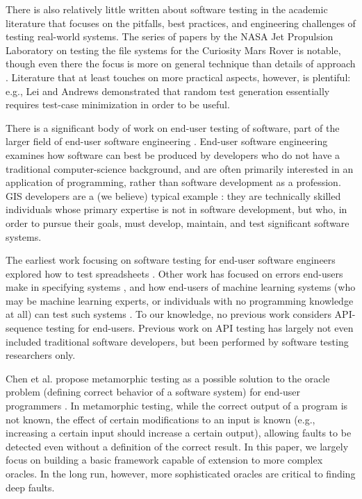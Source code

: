 There is also relatively little written about software testing in the
academic literature that focuses on the pitfalls, best practices, and
engineering challenges of testing real-world systems.  The series of
papers by the NASA Jet Propulsion Laboratory on testing the file
systems for the Curiosity Mars Rover is notable, though even there the
focus is more on general technique than details of approach
\cite{ICSEDiff,CFV08,AMAI}.  Literature that at least touches on more
practical aspects, however, is plentiful: e.g., Lei and Andrews
\cite{MinUnit} demonstrated that random test generation essentially
requires test-case minimization \cite{DD} in order to be useful.

There is a significant body of work on end-user testing of software,
part of the larger field of end-user software engineering
\cite{burnettEUSE,Silos}.  End-user software engineering examines how
software can best be produced by developers who do not have a
traditional computer-science background, and are often primarily
interested in an application of programming, rather than software
development as a profession.  GIS developers are a (we believe)
typical example \cite{Segal07}:  they are technically skilled  individuals whose
primary expertise is not in software development, but who, in order to
pursue their goals, must develop, maintain, and test significant
software systems.

The earliest work focusing on software testing for
end-user software engineers explored how to test spreadsheets
\cite{rothermelTOSEM,rothermel2000wysiwyt}.  Other work has focused on
errors end-users make in specifying systems \cite{Phalgune}, and how
end-users of machine learning systems (who may be machine learning
experts, or individuals with no programming knowledge at all) can test
such systems \cite{OnlyOracle,kulesza-eud11,shinsel-vlhcc}.  To our
knowledge, no previous work considers API-sequence testing for
end-users.  Previous work on API testing has largely not even included
traditional software developers, but been performed by software
testing researchers only.

Chen et al. propose metamorphic testing
\cite{MetaTest,isstamorph,metamorph,chentest} as a possible solution
to the oracle problem (defining correct behavior of a software system)
for end-user programmers \cite{MetamorphEndUser}.  In metamorphic
testing, while the correct output of a program is not known, the
effect of certain modifications to an input is known (e.g., increasing
a certain input should increase a certain output), allowing faults to
be detected even without a definition of the correct result.  In this
paper, we largely focus on building a basic framework capable of
extension to more complex oracles.  In the long run, however, more
sophisticated oracles are critical to finding deep faults.
